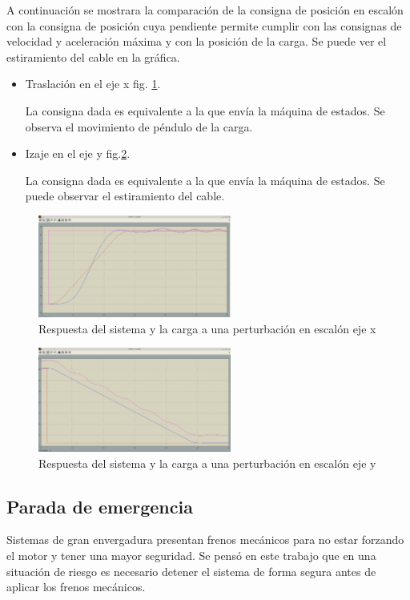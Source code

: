 \documentclass[journal]{IEEEtran}
\begin{document}
A continuación se mostrara la comparación de la consigna de posición en escalón con
la consigna de posición cuya pendiente permite cumplir con las consignas de velocidad
y aceleración máxima y con la posición de la carga. Se puede ver el estiramiento del
cable en la gráfica.
\begin{itemize}
 \item Traslación en el eje x fig. \ref{fig:consposxxl}.
 
 La consigna dada es equivalente a la que envía la máquina de estados. Se observa
 el movimiento de péndulo de la carga.
 \item Izaje en el eje y fig.\ref{fig:consposyyl}.
 
  La consigna dada es equivalente a la que envía la máquina de estados. Se puede 
  observar el estiramiento del cable.
\end{itemize}

\begin{figure}[!t]
 \centering
  \includegraphics[width=2.5in]{consx_posx_xl.jpeg}
  \caption{Respuesta del sistema y la carga a una perturbación en escalón eje x}
  \label{fig:consposxxl}
\end{figure}

\begin{figure}[!t]
 \centering
  \includegraphics[width=2.5in]{consy_posy_yl.jpeg}
  \caption{Respuesta del sistema y la carga a una perturbación en escalón eje y}
  \label{fig:consposyyl}
\end{figure}

\subsection{Parada de emergencia}
Sistemas de gran envergadura presentan frenos mecánicos para no estar forzando el motor
y tener una mayor seguridad. Se pensó en este trabajo que en una situación de riesgo
es necesario detener el sistema de forma segura antes de aplicar los frenos mecánicos.
\end{document}
